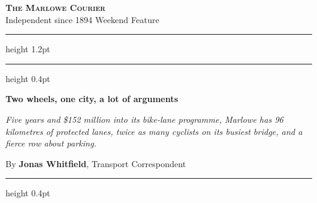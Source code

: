 \documentclass[10pt,a4paper]{article}
\begin{document}
\begin{center}
{\Huge\bfseries\textsc{The Marlowe Courier}}\\[-0.1em]
{\sffamily\scriptsize Independent since 1894 \textperiodcentered{} Weekend Feature}
\end{center}
\vspace{-0.4em}\hrule height 1.2pt\vspace{0.12em}\hrule height 0.4pt

\vspace{0.5em}
{\Huge\bfseries Two wheels, one city, a lot of arguments}\par
\vspace{0.3em}
{\Large\itshape Five years and \$152 million into its bike-lane programme, Marlowe has 96 kilometres of
protected lanes, twice as many cyclists on its busiest bridge, and a fierce row about parking.}\par
\vspace{0.4em}
{\sffamily\small By \textbf{Jonas Whitfield}, Transport Correspondent}
\vspace{0.3em}\hrule height 0.4pt\vspace{0.7em}
\end{document}
